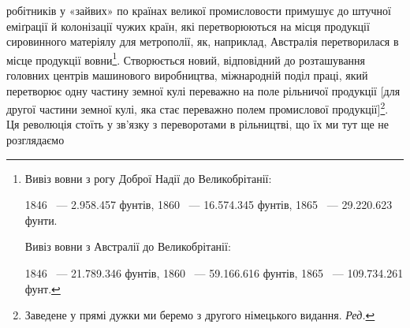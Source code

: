 робітників у «зайвих» по країнах великої промисловости примушує
до штучної еміґрації й колонізації чужих країн, які перетворюються
на місця продукції сировинного матеріялу для метрополії,
як, наприклад, Австралія перетворилася в місце продукції
вовни\footnote{
\noindent{}Вивіз вовни з рогу Доброї Надії до Великобрітанії:

\noindent{}1846~ — \num{2.958.457} фунтів, 1860~ — \num{16.574.345} фунтів, 1865~ —
\num{29.220.623} фунти.

\noindent{}Вивіз вовни з Австралії до Великобрітанії:

\noindent{}1846~ — \num{21.789.346} фунтів, 1860~ — \num{59.166.616} фунтів, 1865~ —
\num{109.734.261} фунт.
}. Створюється новий, відповідний до розташування головних
центрів машинового виробництва, міжнародній поділ праці,
який перетворює одну частину земної кулі переважно на поле
рільничої продукції [для другої частини земної кулі, яка стає
переважно полем промислової продукції]\footnote*{
Заведене у прямі дужки ми беремо з другого німецького видання.
\emph{Ред.}
}. Ця революція стоїть
у зв’язку з переворотами в рільництві, що їх ми тут ще не розглядаємо
